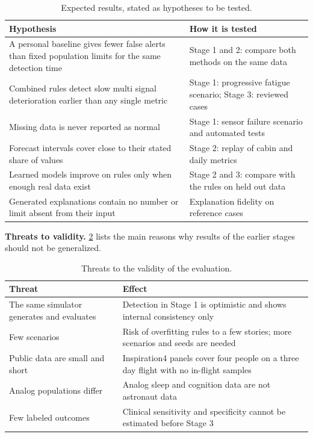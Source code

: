 \begin{table}[htbp]
\centering
\vspace{0.8em}
\caption{Expected results, stated as hypotheses to be tested.}
\label{tab:detection}
\footnotesize
\begin{tabular}{p{4.4cm}p{9.6cm}}
\hline
\textbf{Hypothesis} & \textbf{How it is tested} \\
\hline
A personal baseline gives fewer false alerts than fixed population limits for the same detection time & Stage 1 and 2: compare both methods on the same data \\
Combined rules detect slow multi signal deterioration earlier than any single metric & Stage 1: progressive fatigue scenario; Stage 3: reviewed cases \\
Missing data is never reported as normal & Stage 1: sensor failure scenario and automated tests \\
Forecast intervals cover close to their stated share of values & Stage 2: replay of cabin and daily metrics \\
Learned models improve on rules only when enough real data exist & Stage 2 and 3: compare with the rules on held out data \\
Generated explanations contain no number or limit absent from their input & Explanation fidelity on reference cases \\
\hline
\end{tabular}
\vspace{1.2em}
\end{table}

\medskip\noindent\textbf{Threats to validity.} \ref{tab:threats} lists the main reasons why results of the earlier stages should not be generalized.

\begin{table}[htbp]
\centering
\vspace{0.8em}
\caption{Threats to the validity of the evaluation.}
\label{tab:threats}
\small
\begin{tabular}{p{5.0cm}p{9.0cm}}
\hline
\textbf{Threat} & \textbf{Effect} \\
\hline
The same simulator generates and evaluates & Detection in Stage 1 is optimistic and shows internal consistency only \\
Few scenarios & Risk of overfitting rules to a few stories; more scenarios and seeds are needed \\
Public data are small and short & Inspiration4 panels cover four people on a three day flight with no in-flight samples \\
Analog populations differ & Analog sleep and cognition data are not astronaut data \\
Few labeled outcomes & Clinical sensitivity and specificity cannot be estimated before Stage 3 \\
\hline
\end{tabular}
\vspace{1.2em}
\end{table}

